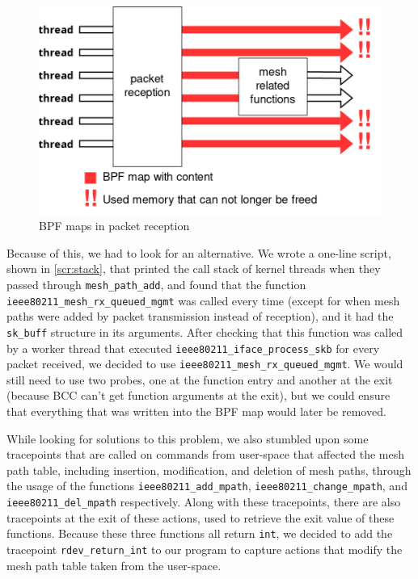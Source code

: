 \begin{figure}[htb]
   \centering
   \includegraphics[scale=.4]{pktin}
   \caption{BPF maps in packet reception}\label{fig:pktrx}
\end{figure}

Because of this, we had to look for an alternative. We wrote a one-line script,
shown in \autoref{scr:stack}, that printed the call stack of kernel threads when
they passed through \texttt{mesh\_path\_add}, and found that the function
\texttt{ieee80211\_mesh\_rx\_queued\_mgmt} was called every time (except for
when mesh paths were added by packet transmission instead of reception), and it
had the \texttt{sk\_buff} structure in its arguments. After checking that this
function was called by a worker thread that executed
\texttt{ieee80211\_iface\_process\_skb} for every packet received, we decided to
use \texttt{ieee80211\_mesh\_rx\_queued\_mgmt}. We would still need to use two
probes, one at the function entry and another at the exit (because \ac{BCC}
can't get function arguments at the exit), but we could ensure that everything
that was written into the BPF map would later be removed.

\begin{sloppypar}
While looking for solutions to this problem, we also stumbled upon some
tracepoints that are called on commands from user-space that affected the mesh
path table, including insertion, modification, and deletion of mesh paths,
through the usage of the functions \texttt{ieee80211\_add\_mpath},
\texttt{ieee80211\_change\_mpath}, and \texttt{ieee80211\_del\_mpath}
respectively. Along with these tracepoints, there are also tracepoints at the
exit of these actions, used to retrieve the exit value of these functions.
Because these three functions all return \texttt{int}, we decided to add the
tracepoint \texttt{rdev\_return\_int} to our program to capture actions that
modify the mesh path table taken from the user-space.
\end{sloppypar}

